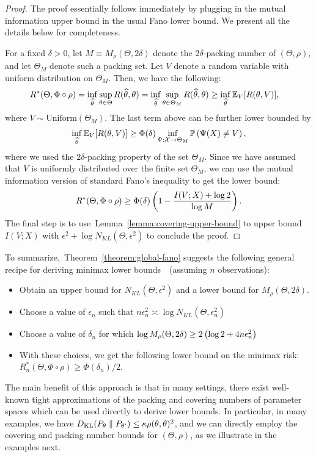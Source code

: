 \documentclass[12pt]{article}
\begin{document}
\begin{proof}
The proof essentially follows immediately by plugging in the mutual information upper bound in the usual Fano lower bound. We present all the details below for completeness. 

For a fixed $\delta>0$, let $M \equiv M_{\rho}(\Theta, 2\delta)$ denote the $2\delta$-packing number of $(\Theta, \rho)$, and let $\Theta_M$ denote such a packing set. Let $V$ denote a random variable with uniform distribution on $\Theta_M$. Then, we have the following: 
\begin{align}
	R^*(\Theta, \Phi \circ \rho) & = \inf_{\widehat{\theta}} \sup_{\theta \in \Theta} R(\widehat{\theta}, \theta) = \inf_{\widehat{\theta}} \sup_{\theta \in \Theta_M} R(\widehat{\theta}, \theta) \geq \inf_{\widehat{\theta}} \mathbb{E}_{V}[R(\theta, V)], 
\end{align}
where $V \sim \mathrm{Uniform}(\Theta_M)$. The last term above can be further lower bounded by 
\begin{align}
\inf_{\widehat{\theta}} \mathbb{E}_{V}[R(\theta, V)] \geq \Phi(\delta) \inf_{\Psi:{\cal X} \to \Theta_M} \mathbb{P}\left( \Psi(X) \neq V \right),  
\end{align}
where we used the $2\delta$-packing property of the set $\Theta_M$. Since we have assumed that $V$ is uniformly distributed over the finite set $\Theta_M$, we can use the mutual information version of standard Fano's inequality to get the lower bound: 
\begin{align}
	R^*(\Theta, \Phi \circ \rho) \geq \Phi(\delta) \left( 1 - \frac{I(V; X) + \log 2}{\log M} \right). 
\end{align}
The final step is to use~Lemma~\ref{lemma:covering-upper-bound} to upper bound $I(V; X)$ with $\epsilon^2 + \log N_{KL}(\Theta, \epsilon^2)$ to conclude the proof. 
\end{proof}
To summarize,~Theorem~\ref{theorem:global-fano} suggests the following general recipe for deriving minimax lower bounds~\cite[Section~12.2.22]{DuchiLectureNotes}~(assuming $n$ \iid observations):
\begin{itemize}
	\item Obtain an upper bound for $N_{KL}(\Theta, \epsilon^2)$ and a lower bound for $M_{\rho}(\Theta, 2\delta)$. 
	\item Choose a value  of $\epsilon_n$ such that $n \epsilon_n^2 \asymp \log N_{KL}(\Theta, \epsilon_n^2)$ 
	\item Choose a value of $\delta_n$ for which $\log M_\rho(\Theta, 2\delta) \geq 2\left( \log 2 + 4 n \epsilon_n^2\right)$
	\item With these choices, we get the following lower bound on the minimax risk: $R_n^*(\Theta, \Phi \circ \rho) \geq \Phi(\delta_n)/2$.  
\end{itemize}
The main benefit of this approach is that in many settings, there exist well-known tight approximations of the packing and covering numbers of parameter spaces which can be used directly to derive lower bounds. In particular, in many examples, we have $D_{\text{KL}}(P_\theta \parallel P_{\theta'}) \leq \kappa \rho(\theta, \theta)^2$, and we can directly employ the covering and packing number bounds for $(\Theta, \rho)$, as we illustrate in the examples next. 
\end{document}
